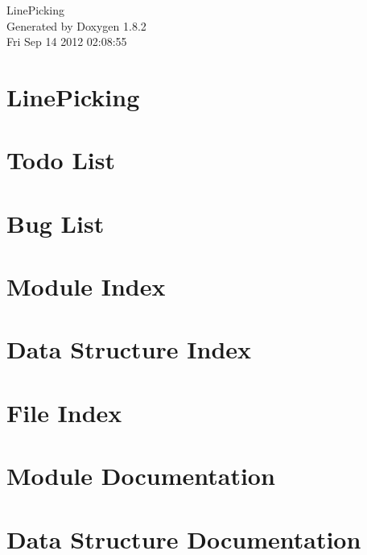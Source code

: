 \documentclass{book}
\begin{document}
\hypersetup{pageanchor=false,citecolor=blue}
\begin{titlepage}
\vspace*{7cm}
\begin{center}
{\Large Line\-Picking }\\
\vspace*{1cm}
{\large Generated by Doxygen 1.8.2}\\
\vspace*{0.5cm}
{\small Fri Sep 14 2012 02:08:55}\\
\end{center}
\end{titlepage}
\clearemptydoublepage
{}
\tableofcontents
\clearemptydoublepage
{}
\hypersetup{pageanchor=true,citecolor=blue}
\chapter{Line\-Picking}
\label{index}\hypertarget{index}{}
\chapter{Todo List}
\label{todo}
\hypertarget{todo}{}

\chapter{Bug List}
\label{bug}
\hypertarget{bug}{}

\chapter{Module Index}

\chapter{Data Structure Index}

\chapter{File Index}

\chapter{Module Documentation}



\chapter{Data Structure Documentation}



\end{document}
